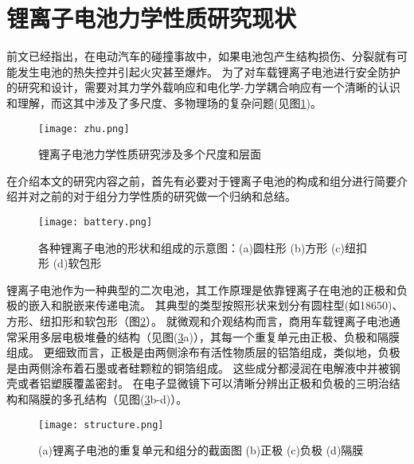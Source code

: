 \section{锂离子电池力学性质研究现状}
前文已经指出，在电动汽车的碰撞事故中，如果电池包产生结构损伤、分裂就有可能发生电池的热失控并引起火灾甚至爆炸。 为了对车载锂离子电池进行安全防护的研究和设计，需要对其力学外载响应和电化学-力学耦合响应有一个清晰的认识和理解，而这其中涉及了多尺度、多物理场的复杂问题(见图\ref{fig:zhu})。\\
\begin{figure}
\centering   
\texttt{[image: zhu.png]}
\caption{锂离子电池力学性质研究涉及多个尺度和层面}
\label{fig:zhu}
\end{figure}
\indent 在介绍本文的研究内容之前，首先有必要对于锂离子电池的构成和组分进行简要介绍并对之前的对于组分力学性质的研究做一个归纳和总结。\\
\begin{figure}
\centering   
\texttt{[image: battery.png]}
\caption{各种锂离子电池的形状和组成的示意图\cite{Tarascon2001Issues}：(a)圆柱形 (b)方形 (c)纽扣形 (d)软包形}
\label{fig:battery}
\end{figure}
\indent 锂离子电池作为一种典型的二次电池，其工作原理是依靠锂离子在电池的正极和负极的嵌入和脱嵌来传递电流。 其典型的类型按照形状来划分有圆柱型(如18650)、方形、纽扣形和软包形（图\ref{fig:battery}）。 就微观和介观结构而言，商用车载锂离子电池通常采用多层电极堆叠的结构（见图(\ref{fig:structure}a)），其每一个重复单元由正极、负极和隔膜组成。 更细致而言，正极是由两侧涂布有活性物质层的铝箔组成，类似地，负极是由两侧涂布着石墨或者硅颗粒的铜箔组成。 这些成分都浸润在电解液中并被钢壳或者铝塑膜覆盖密封。 在电子显微镜下可以清晰分辨出正极和负极的三明治结构和隔膜的多孔结构（见图(\ref{fig:structure}b-d)）。
\begin{figure}
\centering   
\texttt{[image: structure.png]}
\caption{(a)锂离子电池的重复单元和组分的截面图 (b)正极 (c)负极 (d)隔膜}
\label{fig:structure}
\end{figure}

